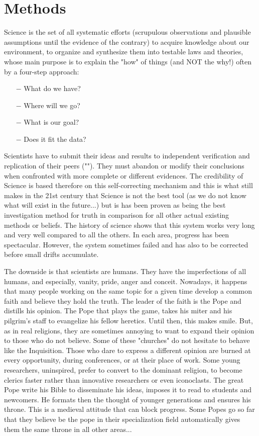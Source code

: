 	\newpage
	\thispagestyle{empty}
	\mbox{}
	\section{Methods}	
	Science is the set of all systematic efforts (scrupulous observations and plausible assumptions until the evidence of the contrary) to acquire knowledge about our environment, to organize and synthesize them into testable laws and theories, whose main purpose is to explain the "how" of things (and NOT the why!) often by a four-step approach:
	\begin{itemize}
		\item[$-$] What do we have?
		\item[$-$] Where will we go?
		\item[$-$] What is our goal?	
		\item[$-$] Does it fit the data?
	\end{itemize}
	Scientists have to submit their ideas and results to independent verification and replication of their peers (""). They must abandon or modify their conclusions when confronted with more complete or different evidences. The credibility of Science is based therefore on this self-correcting mechanism and this is what still makes in the 21st century that Science is not the best tool (as we do not know what will exist in the future...) but is has been proven as being the best investigation method for truth in comparison for all other actual existing methods or beliefs. The history of science shows that this system works very long and very well compared to all the others. In each area, progress has been spectacular. However, the system sometimes failed and has also to be corrected before small drifts accumulate.

	The downside is that scientists are humans. They have the imperfections of all humans, and especially, vanity, pride, anger and conceit. Nowadays, it happens that many people working on the same topic for a given time develop a common faith and believe they hold the truth. The leader of the faith is the Pope and distills his opinion. The Pope that plays the game, takes his miter and his pilgrim's staff to evangelize his fellow heretics. Until then, this makes smile. But, as in real religions, they are sometimes annoying to want to expand their opinion to those who do not believe. Some of these "churches" do not hesitate to behave like the Inquisition. Those who dare to express a different opinion are burned at every opportunity, during conferences, or at their place of work. Some young researchers, uninspired, prefer to convert to the dominant religion, to become clerics faster rather than innovative researchers or even iconoclasts. The great Pope write his Bible to disseminate his ideas, imposes it to read to students and newcomers. He formats then the thought of younger generations and ensures his throne. This is a medieval attitude that can block progress. Some Popes go so far that they believe be the pope in their specialization field automatically gives them the same throne in all other areas...

